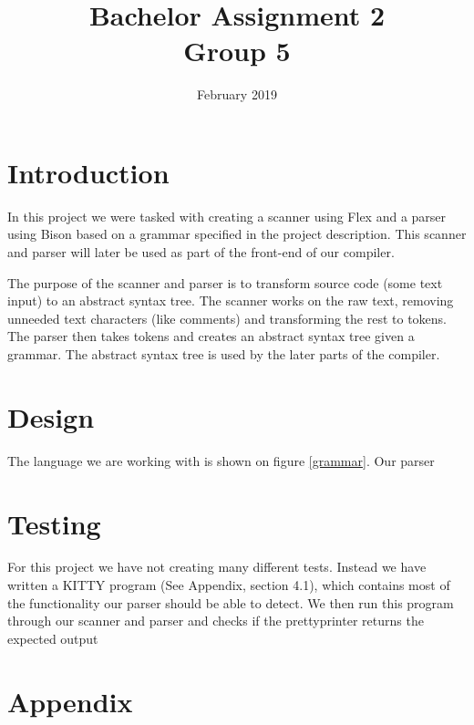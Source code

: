 \documentclass[a4paper]{article}
\title{Bachelor Assignment 2 \\ Group 5}
\date{February 2019}
\begin{document}
\maketitle

\section{Introduction}
In this project we were tasked with creating a scanner using Flex and a parser using Bison based on a grammar specified in the project description. This scanner and parser will later be used as part of the front-end of our compiler.

The purpose of the scanner and parser is to transform source code (some text input) to an abstract syntax tree. The scanner works on the raw text, removing unneeded text characters (like comments) and transforming the rest to tokens. The parser then takes tokens and creates an abstract syntax tree given a grammar. The abstract syntax tree is used by the later parts of the compiler.

\section{Design}



The language we are working with is shown on figure \ref{grammar}. Our parser 

\section{Testing}
For this project we have not creating many different tests. Instead we have written a KITTY program (See Appendix, section 4.1), which contains most of the functionality our parser should be able to detect. We then run this program through our scanner and parser and checks if the prettyprinter returns the expected output

\section{Appendix}
\end{document}
